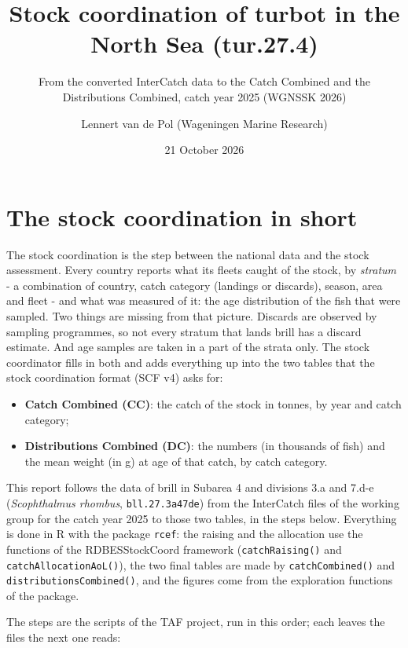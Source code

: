 \documentclass[
  a4paper,
  DIV=11,
  numbers=noendperiod]{scrartcl}
\title{Stock coordination of turbot in the North Sea (tur.27.4)}
\subtitle{From the converted InterCatch data to the Catch Combined and
the Distributions Combined, catch year 2025 (WGNSSK 2026)}
\author{Lennert van de Pol (Wageningen Marine Research)}
\date{21 October 2026}
\providecommand{\tightlist}{%
  \setlength{\itemsep}{0pt}\setlength{\parskip}{0pt}}
\renewcommand*\contentsname{Table of contents}
\newcommand\contentsname{Table of contents}
\begin{document}
\maketitle

\renewcommand*\contentsname{Table of contents}
{
\setcounter{tocdepth}{3}
\tableofcontents
}

\section{The stock coordination in
short}\label{the-stock-coordination-in-short}

The stock coordination is the step between the national data and the
stock assessment. Every country reports what its fleets caught of the
stock, by \emph{stratum} - a combination of country, catch category
(landings or discards), season, area and fleet - and what was measured
of it: the age distribution of the fish that were sampled. Two things
are missing from that picture. Discards are observed by sampling
programmes, so not every stratum that lands brill has a discard
estimate. And age samples are taken in a part of the strata only. The
stock coordinator fills in both and adds everything up into the two
tables that the stock coordination format (SCF v4) asks for:

\begin{itemize}
\tightlist
\item
  \textbf{Catch Combined (CC)}: the catch of the stock in tonnes, by
  year and catch category;
\item
  \textbf{Distributions Combined (DC)}: the numbers (in thousands of
  fish) and the mean weight (in g) at age of that catch, by catch
  category.
\end{itemize}

This report follows the data of brill in Subarea 4 and divisions 3.a and
7.d-e (\emph{Scophthalmus rhombus}, \texttt{bll.27.3a47de}) from the
InterCatch files of the working group for the catch year 2025 to those
two tables, in the steps below. Everything is done in R with the package
\texttt{rcef}: the raising and the allocation use the functions of the
RDBESStockCoord framework (\texttt{catchRaising()} and
\texttt{catchAllocationAoL()}), the two final tables are made by
\texttt{catchCombined()} and \texttt{distributionsCombined()}, and the
figures come from the exploration functions of the package.

The steps are the scripts of the TAF project, run in this order; each
leaves the files the next one reads:
\end{document}

